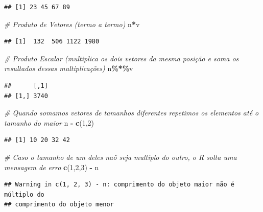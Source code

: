 \documentclass[
]{book}
\newenvironment{Shaded}{\begin{snugshade}}{\end{snugshade}}
\newcommand{\CommentTok}[1]{\textcolor[rgb]{0.56,0.35,0.01}{\textit{#1}}}
\newcommand{\DecValTok}[1]{\textcolor[rgb]{0.00,0.00,0.81}{#1}}
\newcommand{\FunctionTok}[1]{\textcolor[rgb]{0.13,0.29,0.53}{\textbf{#1}}}
\newcommand{\NormalTok}[1]{#1}
\newcommand{\SpecialCharTok}[1]{\textcolor[rgb]{0.81,0.36,0.00}{\textbf{#1}}}
\begin{document}
\begin{verbatim}
## [1] 23 45 67 89
\end{verbatim}

\begin{Shaded}
\begin{Highlighting}[]
\CommentTok{\# Produto de Vetores (termo a termo)}
\NormalTok{n}\SpecialCharTok{*}\NormalTok{v}
\end{Highlighting}
\end{Shaded}

\begin{verbatim}
## [1]  132  506 1122 1980
\end{verbatim}

\begin{Shaded}
\begin{Highlighting}[]
\CommentTok{\# Produto Escalar (multiplica os dois vetores da mesma posição e soma os resultados dessas multiplicações)}
\NormalTok{n}\SpecialCharTok{\%*\%}\NormalTok{v}
\end{Highlighting}
\end{Shaded}

\begin{verbatim}
##      [,1]
## [1,] 3740
\end{verbatim}

\begin{Shaded}
\begin{Highlighting}[]
\CommentTok{\# Quando somamos vetores de tamanhos diferentes repetimos os elementos até o tamanho do maior}
\NormalTok{n }\SpecialCharTok{{-}} \FunctionTok{c}\NormalTok{(}\DecValTok{1}\NormalTok{,}\DecValTok{2}\NormalTok{)}
\end{Highlighting}
\end{Shaded}

\begin{verbatim}
## [1] 10 20 32 42
\end{verbatim}

\begin{Shaded}
\begin{Highlighting}[]
\CommentTok{\# Caso o tamanho de um deles naõ seja multiplo do outro, o R solta uma mensagem de erro}
\FunctionTok{c}\NormalTok{(}\DecValTok{1}\NormalTok{,}\DecValTok{2}\NormalTok{,}\DecValTok{3}\NormalTok{) }\SpecialCharTok{{-}}\NormalTok{ n}
\end{Highlighting}
\end{Shaded}

\begin{verbatim}
## Warning in c(1, 2, 3) - n: comprimento do objeto maior não é múltiplo do
## comprimento do objeto menor
\end{verbatim}
\end{document}
